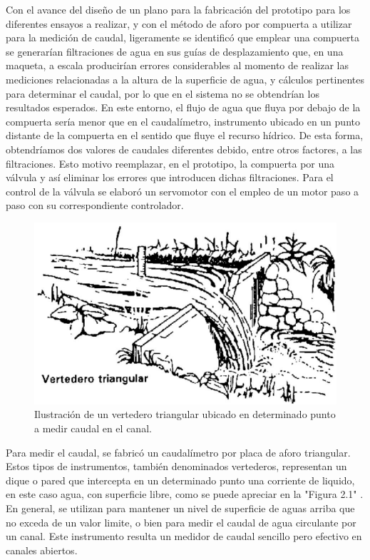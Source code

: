 Con el avance del diseño de un plano para la fabricación del prototipo para los diferentes ensayos a realizar, y con el método de aforo por compuerta a utilizar para la medición de caudal, ligeramente se identificó que emplear una compuerta se generarían filtraciones de agua en sus guías de desplazamiento que, en una maqueta, a escala producirían errores considerables al momento de realizar las mediciones relacionadas a la altura de la superficie de agua, y cálculos pertinentes para determinar el caudal, por lo que en el sistema no se obtendrían los resultados esperados. En este entorno, el flujo de agua que fluya por debajo de la compuerta sería menor que en el caudalímetro, instrumento ubicado en un punto distante de la compuerta en el sentido que fluye el recurso hídrico. De esta forma, obtendríamos dos valores de caudales diferentes debido, entre otros factores, a las filtraciones.     
Esto motivo reemplazar, en el prototipo, la compuerta por una válvula y así eliminar los errores que introducen dichas filtraciones. 
Para el control de la válvula se elaboró un servomotor con el empleo de un motor paso a paso con su correspondiente controlador.
\begin{figure}[h]
\centering
\includegraphics[scale=.50]{./Figures/VertederoTriangular.png}
\caption{Ilustración de un vertedero triangular ubicado en determinado punto a medir caudal en el canal.}
\end{figure}

Para medir el caudal, se fabricó un caudalímetro por placa de aforo triangular. Estos tipos de instrumentos, también denominados vertederos, representan un dique o pared que intercepta en un determinado punto una corriente de liquido, en este caso agua, con superficie libre, como se puede apreciar en la "Figura 2.1" . En general, se utilizan para mantener un nivel de superficie de aguas arriba que no exceda de un valor limite, o bien para medir el caudal de agua circulante por un canal. Este instrumento resulta un medidor de caudal sencillo pero efectivo en canales abiertos. 

